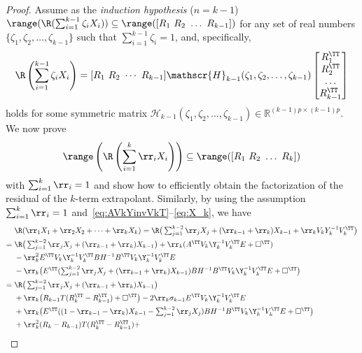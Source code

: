 \begin{proof}
Assume as the \textit{induction hypothesis} ($n=k-1$)
$\range (\R(\sum_{i=1}^{k-1}\zeta_i X_i))\subseteq \range([R_1\ R_2\ \dots\
R_{k-1}])$
for any set of real numbers $\{\zeta_1,\zeta_2,\dots,\zeta_{k-1}\}$ such that  $\sum_{i=1}^{k-1}\zeta_i=1$, and, specifically,
\begin{equation*}
	\R\left(\sum_{i=1}^{k-1}\zeta_i X_i\right) =
	[	R_1 \ R_2 \ \cdots \ R_{k-1}]
	\mathscr{H}_{k-1}(\zeta_1,\zeta_2,\dots,\zeta_{k-1})
	\begin{bmatrix}
		R_1^\TT \\ R_2^\TT \\ \dots \\ R_{k-1}^\TT
	\end{bmatrix}
\end{equation*}
holds for some symmetric matrix
$\mathscr{H}_{k-1}(\zeta_1,\zeta_2,\dots,\zeta_{k-1})\in\mathbb{R}^{(k-1)p\times (k-1)p}$.
We now prove
\begin{equation*}
  \range \left(\R\left(\sum_{i=1}^{k}\rr_i X_i\right)\right)\subseteq
  \range([R_1\ R_2\ \dots\ R_{k}])
\end{equation*}
with $\sum_{i=1}^{k}\rr_i=1$ and show how to efficiently obtain the factorization of the residual
of the $k$-term extrapolant. Similarly, by using the assumption $\sum_{i=1}^{k}\rr_i=1$
and~\eqref{eq:AVkYinvVkT}--\eqref{eq:X_k}, we have
\begin{align*}
	& \R(\rr_1 X_1 + \rr_2 X_2 + \cdots+ \rr_k X_k) = \textstyle \R\big(\sum_{j=1}^{k-2}\rr_{j}X_j
	+ (\rr_{k-1}+\rr_k)X_{k-1} + \rr_k V_k Y_k^{-1}V_k^\TT \big)
	\\
	={}& \textstyle \R\big(\sum_{j=1}^{k-2}\rr_{j}X_j + (\rr_{k-1}+\rr_k)X_{k-1}\big)
	+ \rr_k(A^\TT V_k\Y_k^{-1}V_k^\TT E + \square^\TT) \\
	&- \rr_k^2 E^\TT V_k\Y_k^{-1}V_k^\TT BH^{-1}B^\TT V_k\Y_k^{-1}V_k^\TT E \\
	& \textstyle -\rr_k\big(E^\TT(\sum_{j=1}^{k-2}\rr_{j}X_j +
	(\rr_{k-1}+\rr_k)X_{k-1})BH^{-1}B^\TT V_k\Y_k^{-1}V_k^\TT E+\square^\TT\big)
	\\
	={}& \textstyle \R\big(\sum_{j=1}^{k-2}\rr_{j}X_j + (\rr_{k-1}+\rr_k)X_{k-1}\big)\\
    &+\rr_k\big(R_{k-1}T(R_k^\TT-R_{k-1}^\TT) +\square^\TT\big) -
	  2\rr_k\sigma_{k-1} E^\TT V_k\Y_k^{-1}V_k^\TT E \\
	&+ \textstyle \rr_k\big(E^\TT((1-\rr_{k-1}-\rr_k)X_{k-1}-\sum_{j=1}^{k-2}\rr_{j}X_j)
		BH^{-1}B^\TT V_k\Y_k^{-1}V_k^\TT E + \square^\TT\big) \\
	&+  \textstyle  \rr_k^2(R_k-R_{k-1})T(R_k^\TT-R_{k-1}^\TT) +

\end{align*}
\end{proof}
